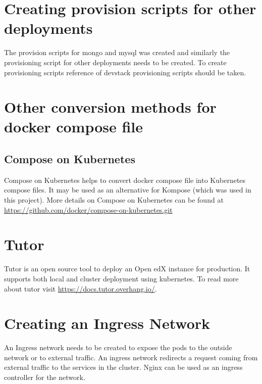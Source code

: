 \documentclass[12pt]{report}
\begin{document}
\section{Creating provision scripts for other deployments}
The provision scripts for mongo and mysql was created and similarly the provisioning script for other deployments needs to be created. To create provisioning scripts reference of devstack provisioning scripts should be taken. 
\section{Other conversion methods for docker compose file}
\subsection{Compose on Kubernetes}
Compose on Kubernetes helps to convert docker compose file into Kubernetes compose files. It may be used as an alternative for Kompose (which was used in this project). More details on Compose on Kubernetes can be found at \url{https://github.com/docker/compose-on-kubernetes.git}\cite{Compose}
\section{Tutor}
Tutor is an open source tool to deploy an Open edX instance for production. It supports both local and cluster deployment using kubernetes. To read more about tutor visit \url{https://docs.tutor.overhang.io/}\cite{Tutor}. 
\section{Creating an Ingress Network}
An Ingress network needs to be created to expose the pods to the outside network or to external traffic. An ingress network redirects a request coming from external traffic to the services in the cluster. Nginx can be used as an ingress controller for the network.
\pagebreak




\end{document}
